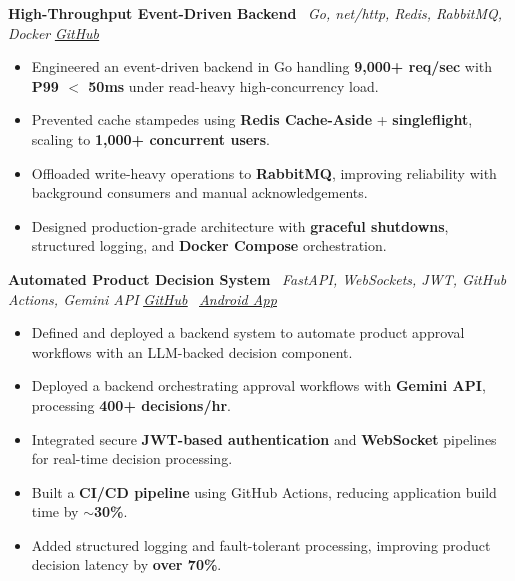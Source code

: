 \documentclass[a4paper,10pt]{article}
\newcommand{\ulhref}[2]{\href{#1}{\uline{#2}}}
\begin{document}
\textbf{High-Throughput Event-Driven Backend} \textbar\ \textit{Go, net/http, Redis, RabbitMQ, Docker} \hfill \textit{\ulhref{https://github.com/PunVas/golang-proj-adv-bknd}{GitHub}}
\begin{itemize}
    \item Engineered an event-driven backend in Go handling \textbf{9,000+ req/sec} with \textbf{P99 $<$ 50ms} under read-heavy high-concurrency load.
    \item Prevented cache stampedes using \textbf{Redis Cache-Aside} + \textbf{singleflight}, scaling to \textbf{1,000+ concurrent users}.
    \item Offloaded write-heavy operations to \textbf{RabbitMQ}, improving reliability with background consumers and manual acknowledgements.
    \item Designed production-grade architecture with \textbf{graceful shutdowns}, structured logging, and \textbf{Docker Compose} orchestration.
\end{itemize}

\textbf{Automated Product Decision System} \textbar\ \textit{FastAPI, WebSockets, JWT, GitHub Actions, Gemini API} \hfill \textit{\ulhref{https://github.com/Akshit2807/Eco_Cycle}{GitHub}} \textbar\ \textit{\ulhref{https://github.com/Akshit2807/Eco_Cycle/releases/download/v1.52-a2f301a/eco-cycle.v52.apk}{Android App}}
\begin{itemize}
    \item Defined and deployed a backend system to automate product approval workflows with an LLM-backed decision component.
    \item Deployed a backend orchestrating approval workflows with \textbf{Gemini API}, processing \textbf{400+ decisions/hr}.
    \item Integrated secure \textbf{JWT-based authentication} and \textbf{WebSocket} pipelines for real-time decision processing.
    \item Built a \textbf{CI/CD pipeline} using GitHub Actions, reducing application build time by \textbf{$\sim$30\%}.
    \item Added structured logging and fault-tolerant processing, improving product decision latency by \textbf{over 70\%}.
\end{itemize}
\end{document}
